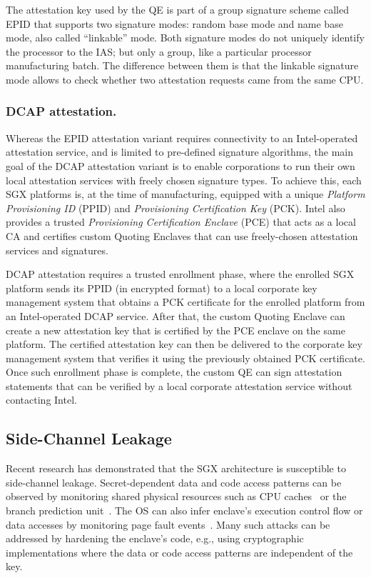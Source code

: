 The attestation key used by the QE is part of a group signature scheme called EPID that supports two signature modes: random base mode and name base mode, also called ``linkable'' mode. Both signature modes do not uniquely identify the processor to the IAS; but only a group, like a particular processor manufacturing batch. The difference between them is that the linkable signature mode allows to check whether two attestation requests came from the same CPU. 


\subsubsection{DCAP attestation.} Whereas the EPID attestation variant requires connectivity to an Intel-operated attestation service, and is limited to pre-defined signature algorithms, the main goal of the DCAP attestation variant is to enable corporations to run their own local attestation services with freely chosen signature types. To achieve this, each SGX platforms is, at the time of manufacturing, equipped with a unique \emph{Platform Provisioning ID} (PPID) and \emph{Provisioning Certification Key} (PCK). Intel also provides a trusted \emph{Provisioning Certification Enclave} (PCE) that acts as a local CA and certifies custom Quoting Enclaves that can use freely-chosen attestation services and signatures.

DCAP attestation requires a trusted enrollment phase, where the enrolled SGX platform sends its PPID (in encrypted format) to a local corporate key management system that obtains a PCK certificate for the enrolled platform from an Intel-operated DCAP service. After that, the custom Quoting Enclave can create a new attestation key that is certified by the PCE enclave on the same platform. The certified attestation key can then be delivered to the corporate key management system that verifies it using the previously obtained PCK certificate. Once such enrollment phase is complete, the custom QE can sign attestation statements that can be verified by a local corporate attestation service without contacting Intel.



\subsection{Side-Channel Leakage}
\label{sec:background:attacks}

Recent research has demonstrated that the SGX architecture is susceptible to side-channel leakage. Secret-dependent data and code access patterns can be observed by monitoring shared physical resources such as CPU caches~\cite{sgxcache,gotzfried2017cache,moghimi2017cachezoom} or the branch prediction unit~\cite{lee2017inferring}. The OS can also infer enclave's execution control flow or data accesses by monitoring page fault events~\cite{xu2015controlled}. Many such attacks can be addressed by hardening the enclave's code, e.g., using cryptographic implementations where the data or code access patterns are independent of the key.

